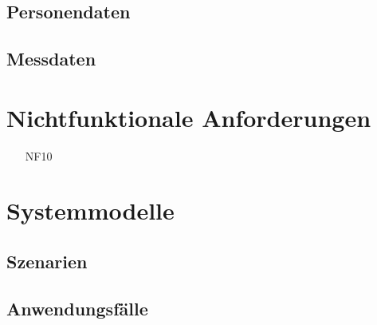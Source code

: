 \documentclass[a4paper,12pt]{article}
\begin{document}




\subsection{Personendaten}
\subsection{Messdaten}

\section{Nichtfunktionale Anforderungen}
\begin{itemize}[nosep]
\item[NF10]
\end{itemize}

\section{Systemmodelle}

\subsection{Szenarien}

\subsection{Anwendungsfälle}






\end{document}
